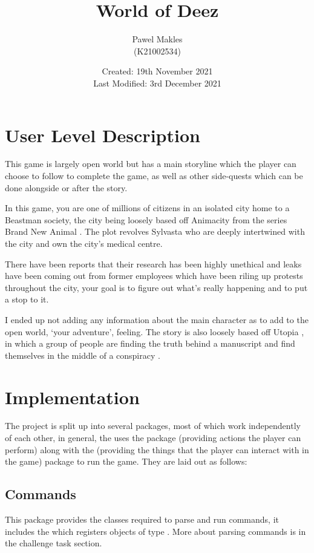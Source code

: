 \documentclass{article}
\title{World of Deez}
\author{Pawel Makles \\ \small (K21002534)}
\date{\small Created: 19th November 2021 \\ Last Modified: 3rd December 2021}
\begin{document}
\maketitle

    \begin{multicols}{2}
        \section{User Level Description}
        This game is largely open world but has a main storyline which the player can choose to follow to complete the game, as well as other side-quests which can be done alongside or after the story.

        In this game, you are one of millions of citizens in an isolated city home to a Beastman \cite{beastman} society, the city being loosely based off Animacity \cite{animacity} from the series Brand New Animal \cite{bna}. The plot revolves Sylvasta who are deeply intertwined with the city and own the city's medical centre.

        There have been reports that their research has been highly unethical and leaks have been coming out from former employees which have been riling up protests throughout the city, your goal is to figure out what's really happening and to put a stop to it.

        I ended up not adding any information about the main character as to add to the open world, `your adventure', feeling. The story is also loosely based off Utopia \cite{utopia}, in which a group of people are finding the truth behind a manuscript and find themselves in the middle of a conspiracy \cite{pyrocynical}.
        
        \section{Implementation}
        The project is split up into several packages, most of which work independently of each other, in general, the  uses the  package (providing actions the player can perform) along with the  (providing the things that the player can interact with in the game) package to run the game. They are laid out as follows:
        
            \subsection{Commands}
            This package provides the classes required to parse and run commands, it includes the  which registers objects of type . More about parsing commands is in the challenge task section.


\end{multicols}
\end{document}
